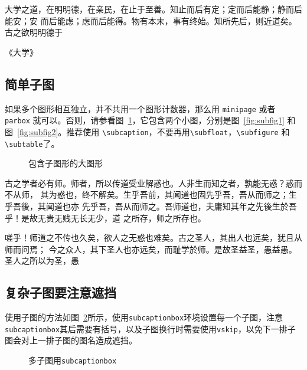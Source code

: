大学之道，在明明德，在亲民，在止于至善。知止而后有定；定而后能静；静而后能安；安
而后能虑；虑而后能得。物有本末，事有终始。知所先后，则近道矣。古之欲明明德于

\hfill \pozhehao《大学》


\subsection{简单子图}
\label{sec:multifig}

如果多个图形相互独立，并不共用一个图形计数器，那么用 \verb|minipage| 或者
\verb|parbox| 就可以。否则，请参看图~\ref{fig:big1}，它包含两个小图，分别是图~\ref{fig:subfig1}
和图~\ref{fig:subfig2}。推荐使用 \verb|\subcaption|，不要再用\verb|\subfloat|，\verb|\subfigure| 和 \verb|\subtable|了。
\begin{figure} %
  \centering%
  \hspace{4em}%
  \caption{包含子图形的大图形}
  \label{fig:big1}
\end{figure}

古之学者必有师。师者，所以传道受业解惑也。人非生而知之者，孰能无惑？惑而不从师，
其为惑也，终不解矣。生乎吾前，其闻道也固先乎吾，吾从而师之；生乎吾後，其闻道也亦
先乎吾，吾从而师之。吾师道也，夫庸知其年之先後生於吾乎！是故无贵无贱无长无少，道
之所存，师之所存也。

嗟乎！师道之不传也久矣，欲人之无惑也难矣。古之圣人，其出人也远矣，犹且从师而问焉；
今之众人，其下圣人也亦远矣，而耻学於师。是故圣益圣，愚益愚。圣人之所以为圣，愚


\subsection{复杂子图要注意遮挡}
使用子图的方法如图~\ref{fig:chap2:zitu}所示，使用\texttt{subcaptionbox}环境设置每一个子图，注意\texttt{subcaptionbox}其后需要有括号，以及子图换行时需要使用\texttt{vskip}，以免下一排子图会对上一排子图的图名造成遮挡。
\begin{figure}[htbp]
\centering
\vskip0.5cm
\caption{多子图用\texttt{subcaptionbox}}\label{fig:chap2:zitu}
\end{figure}


